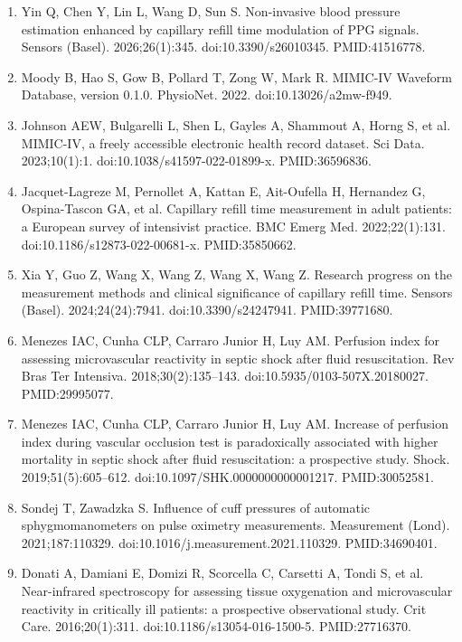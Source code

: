 \documentclass[twocolumn,letterpaper,10pt]{article}
\begin{document}
{\begin{enumerate}[leftmargin=2em,itemsep=2pt,label={\arabic*.}]
\item Yin Q, Chen Y, Lin L, Wang D, Sun S. Non-invasive blood pressure estimation enhanced by capillary refill time modulation of PPG signals. Sensors (Basel). 2026;26(1):345. doi:10.3390/s26010345. PMID:41516778.

\item Moody B, Hao S, Gow B, Pollard T, Zong W, Mark R. MIMIC-IV Waveform Database, version 0.1.0. PhysioNet. 2022. doi:10.13026/a2mw-f949.

\item Johnson AEW, Bulgarelli L, Shen L, Gayles A, Shammout A, Horng S, et al. MIMIC-IV, a freely accessible electronic health record dataset. Sci Data. 2023;10(1):1. doi:10.1038/s41597-022-01899-x. PMID:36596836.

\item Jacquet-Lagreze M, Pernollet A, Kattan E, Ait-Oufella H, Hernandez G, Ospina-Tascon GA, et al. Capillary refill time measurement in adult patients: a European survey of intensivist practice. BMC Emerg Med. 2022;22(1):131. doi:10.1186/s12873-022-00681-x. PMID:35850662.

\item Xia Y, Guo Z, Wang X, Wang Z, Wang X, Wang Z. Research progress on the measurement methods and clinical significance of capillary refill time. Sensors (Basel). 2024;24(24):7941. doi:10.3390/s24247941. PMID:39771680.

\item Menezes IAC, Cunha CLP, Carraro Junior H, Luy AM. Perfusion index for assessing microvascular reactivity in septic shock after fluid resuscitation. Rev Bras Ter Intensiva. 2018;30(2):135--143. doi:10.5935/0103-507X.20180027. PMID:29995077.

\item Menezes IAC, Cunha CLP, Carraro Junior H, Luy AM. Increase of perfusion index during vascular occlusion test is paradoxically associated with higher mortality in septic shock after fluid resuscitation: a prospective study. Shock. 2019;51(5):605--612. doi:10.1097/SHK.0000000000001217. PMID:30052581.

\item Sondej T, Zawadzka S. Influence of cuff pressures of automatic sphygmomanometers on pulse oximetry measurements. Measurement (Lond). 2021;187:110329. doi:10.1016/j.measurement.2021.110329. PMID:34690401.

\item Donati A, Damiani E, Domizi R, Scorcella C, Carsetti A, Tondi S, et al. Near-infrared spectroscopy for assessing tissue oxygenation and microvascular reactivity in critically ill patients: a prospective observational study. Crit Care. 2016;20(1):311. doi:10.1186/s13054-016-1500-5. PMID:27716370.


\end{enumerate}}
\end{document}
